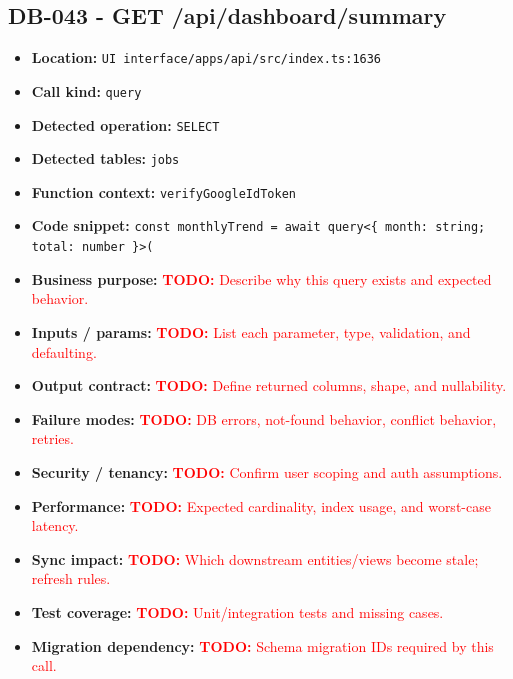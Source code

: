 \documentclass[11pt]{article}
\newcommand{\todoitem}[1]{\textcolor{red}{\textbf{TODO:} #1}}
\begin{document}
\subsection{DB-043 - GET /api/dashboard/summary}
\begin{itemize}[leftmargin=1.5em]
\item \textbf{Location:} \texttt{UI interface/apps/api/src/index.ts:1636}
\item \textbf{Call kind:} \texttt{query}
\item \textbf{Detected operation:} \texttt{SELECT}
\item \textbf{Detected tables:} \texttt{jobs}
\item \textbf{Function context:} \texttt{verifyGoogleIdToken}
\item \textbf{Code snippet:} \texttt{const monthlyTrend = await query<\{ month: string; total: number \}>(}
\item \textbf{Business purpose:} \todoitem{Describe why this query exists and expected behavior.}
\item \textbf{Inputs / params:} \todoitem{List each parameter, type, validation, and defaulting.}
\item \textbf{Output contract:} \todoitem{Define returned columns, shape, and nullability.}
\item \textbf{Failure modes:} \todoitem{DB errors, not-found behavior, conflict behavior, retries.}
\item \textbf{Security / tenancy:} \todoitem{Confirm user scoping and auth assumptions.}
\item \textbf{Performance:} \todoitem{Expected cardinality, index usage, and worst-case latency.}
\item \textbf{Sync impact:} \todoitem{Which downstream entities/views become stale; refresh rules.}
\item \textbf{Test coverage:} \todoitem{Unit/integration tests and missing cases.}
\item \textbf{Migration dependency:} \todoitem{Schema migration IDs required by this call.}
\end{itemize}
\end{document}
